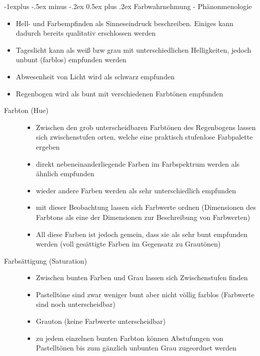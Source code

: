 \documentclass[10pt,landscape]{article}
\makeatletter
\renewcommand{\subsection}{\@startsection{subsection}{2}{0mm}%
                                {-1explus -.5ex minus -.2ex}%
                                {0.5ex plus .2ex}%
                                {\normalfont\normalsize\bfseries}}
\makeatother
\begin{document}
\begin{multicols}{3}
\subsection{ Farbwahrnehmung - Phänonmenologie}
\begin{itemize}
  \item Hell- und Farbempfinden als Sinneseindruck beschreiben. Einiges kann dadurch bereits qualitativ erschlossen werden
  \item Tageslicht kann als weiß bzw grau mit unterschiedlichen Helligkeiten, jedoch unbunt (farblos) empfunden werden
  \item Abwesenheit von Licht wird als schwarz empfunden
  \item Regenbogen wird als bunt mit verschiedenen Farbtönen empfunden
\end{itemize}
\begin{description}
  \item[Farbton (Hue)]
        \begin{itemize}
          \item Zwischen den grob unterscheidbaren Farbtönen des Regenbogens lassen sich zwischenstufen orten, welche eine praktisch stufenlose Farbpalette ergeben
          \item direkt nebeneinanderliegende Farben im Farbspektrum werden als ähnlich empfunden
          \item wieder andere Farben werden als sehr unterschiedlich empfunden
          \item mit dieser Beobachtung lassen sich Farbwerte ordnen (Dimensionen des Farbtons als eine der Dimensionen zur Beschreibung von Farbwerten)
          \item All diese Farben ist jedoch gemein, dass sie als sehr bunt empfunden werden (voll gesättigte Farben im Gegensatz zu Grautönen)
        \end{itemize}
  \item[Farbsättigung (Saturation)]
        \begin{itemize}
          \item  Zwischen bunten Farben und Grau lassen sich Zwischenstufen finden
          \item Pastelltöne sind zwar weniger bunt aber nicht völlig farblos (Farbwerte sind noch unterscheidbar)
          \item Grauton (keine Farbwerte unterscheidbar)
          \item zu jedem einzelnen bunten Farbton können Abstufungen von Pastelltönen bis zum gänzlich unbunten Grau zugeordnet werden

\end{itemize}
\end{description}
\end{multicols}
\end{document}
